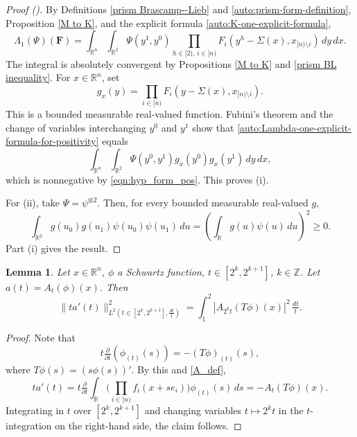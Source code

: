 \documentclass[12pt,reqno]{amsart}
\newcommand{\auto}{{({\tiny\faCar})}}
\theoremstyle{plain}
\newtheorem{lemma}[theorem]{Lemma}
\numberwithin{equation}{section}
\theoremstyle{remark}
\newcommand{\Z}{{\mathbb Z}}
\newcommand{\R}{{\mathbb R}}
\newcommand{\F}{\mathbf{F}}
\begin{document}
\begin{proof}[Proof \auto]
By Definitions \ref{prism Brascamp--Lieb} and \ref{auto:prism-form-definition}, Proposition \ref{M to K}, and the explicit formula \eqref{auto:K-one-explicit-formula},
\begin{equation}\label{auto:Lambda-one-explicit-formula-for-positivity}
\Lambda_1(\Psi)(\F)
=
\int_{\R^n}\int_{\R^2}
\Psi(y^1,y^0)
\prod_{h\in[2),\,i\in[n)}
F_i(y^h-\Sigma(x),x_{[n)\setminus i})
\,dy\,dx.
\end{equation}
The integral is absolutely convergent by Propositions \ref{M to K} and \ref{prism BL inequality}. For $x\in\R^n$, set
\begin{equation}\label{auto:Lambda-one-positivity-test-function}
g_x(y)=\prod_{i\in[n)}F_i(y-\Sigma(x),x_{[n)\setminus i}).
\end{equation}
This is a bounded measurable real-valued function. Fubini's theorem and the change of variables interchanging $y^0$ and $y^1$ show that \eqref{auto:Lambda-one-explicit-formula-for-positivity} equals
\begin{equation}\label{auto:Lambda-one-positive-fiber-integral}
\int_{\R^n}\int_{\R^2}
\Psi(y^0,y^1)g_x(y^0)g_x(y^1)\,dy\,dx,
\end{equation}
which is nonnegative by \eqref{eqn:hyp_form_pos}. This proves (i).

For (ii), take $\Psi=\psi^{\otimes2}$. Then, for every bounded measurable real-valued $g$,
\begin{equation}\label{auto:tensor-square-kernel-positivity}
\int_{\R^2}g(u_0)g(u_1)\psi(u_0)\psi(u_1)\,du
=
\left(\int_\R g(u)\psi(u)\,du\right)^2
\ge0.
\end{equation}
Part (i) gives the result.
\end{proof}

\begin{lemma} \label{lem:ftc_ATphi}
Let $x\in \R^n$, $\phi$ a Schwartz function,  $t\in [2^k, 2^{k+1}]$, $k\in \Z$. Let $a(t)=A_t(\phi)(x)$. Then
\begin{equation}\label{auto:average-logarithmic-derivative-identity} \|ta'(t)\|_{L^2(t\in [2^k, 2^{k+1}],\tfrac{dt}{t})}^2 = \int_{1}^2 |A_{2^k t}(T\phi)(x)|^2\,\tfrac{dt}{t}. \end{equation}
\end{lemma}

\begin{proof}
Note that
\begin{equation}\label{shortlongftc_reduction_pf3}
t\tfrac{\partial}{\partial t}(\phi_{(t)}(s)) = -(T\phi)_{(t)}(s),
\end{equation}
where $T\phi(s) = (s \phi(s))'$.
    By this and \eqref{A_def},
\[ ta'(t) = t\tfrac{\partial}{\partial t}\int_{\mathbb{R}} \Big(\prod_{i\in [n)} f_i(x+se_i)\Big)\phi_{(t)}(s)\,ds = -A_t(T\phi)(x). \]
Integrating in $t$ over $[2^k,2^{k+1}]$ and changing variables $t \mapsto 2^k t$ in the $t$-integration on the right-hand side,
the claim follows.
\end{proof}
\end{document}
